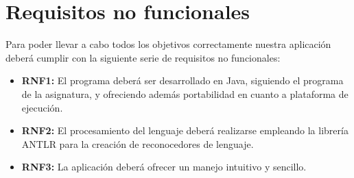    \section{Requisitos no funcionales}
   Para poder llevar a cabo todos los objetivos correctamente nuestra aplicación deberá cumplir con la siguiente serie de requisitos no funcionales:
   \begin{itemize}
      \item \textbf{RNF1:} El programa deberá ser desarrollado en Java, siguiendo el programa de la asignatura, y ofreciendo además
            portabilidad en cuanto a plataforma de ejecución.
      \item \textbf{RNF2:} El procesamiento del lenguaje deberá realizarse empleando la librería ANTLR para la creación de reconocedores de lenguaje.
      \item \textbf{RNF3:} La aplicación deberá ofrecer un manejo intuitivo y sencillo.
   \end{itemize}
